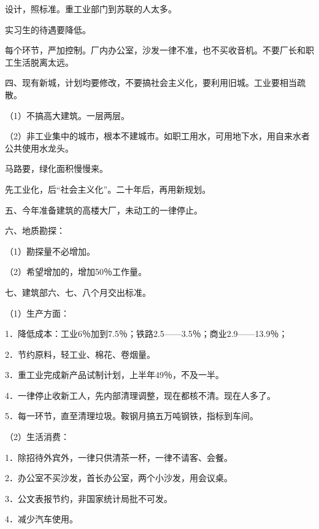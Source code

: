 设计，照标准。重工业部门到苏联的人太多。

实习生的待遇要降低。

每个环节，严加控制。厂内办公室，沙发一律不准，也不买收音机。不要厂长和职工生活脱离太远。

四、现有新城，计划均要修改，不要搞社会主义化，要利用旧城。工业要相当疏散。

（1）不搞高大建筑。一层两层。

（2）非工业集中的城市，根本不建城市。如职工用水，可用地下水，用自来水者公共使用水龙头。

马路要，绿化面积慢慢来。

先工业化，后“社会主义化”。二十年后，再用新规划。

五、今年准备建筑的高楼大厂，未动工的一律停止。

六、地质勘探：

（1）勘探量不必增加。

（2）希望增加的，增加50％工作量。

七、建筑部六、七、八个月交出标准。

（1）生产方面：

1．降低成本：工业6％加到7.5％；铁路2.5——3.5％；商业2.9——13.9％；

2．节约原料，轻工业、棉花、卷烟量。

3．重工业完成新产品试制计划，上半年49％，不及一半。

4．一律停止收新工人，先内部清理调整，现在都核不清。现在人多了。

5．每一环节，直至清理垃圾。鞍钢月搞五万吨钢铁，指标到车间。

（2）生活消费：

1．除招待外宾外，一律只供清茶一杯，一律不请客、会餐。

2．办公室不买沙发，首长办公室，两个小沙发，用会议桌。

3．公文表报节约，非国家统计局批不可发。

4．减少汽车使用。



